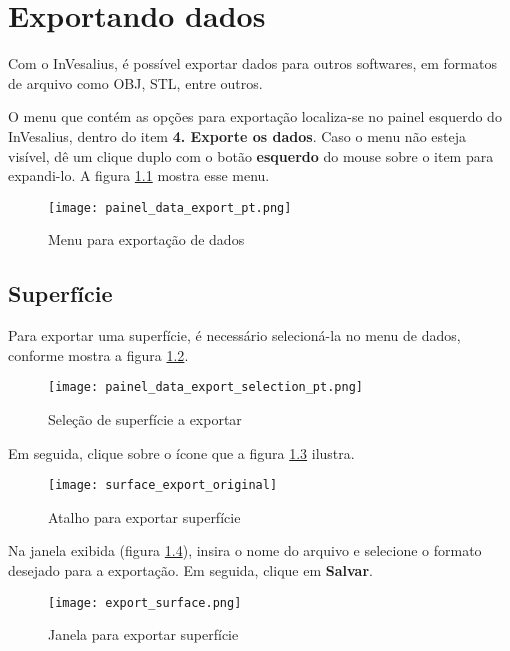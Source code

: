 \chapter{Exportando dados}

Com o InVesalius, é possível exportar dados para outros softwares, em formatos de arquivo
como OBJ, STL, entre outros.

O menu que contém as opções para exportação localiza-se no painel esquerdo do InVesalius,
dentro do item \textbf{4. Exporte os dados}. Caso o menu não esteja visível, dê um clique
duplo com o botão \textbf{esquerdo} do mouse sobre o item para expandi-lo. A figura
\ref{fig:data_export} mostra esse menu.

\begin{figure}[!htb]
\centering
\texttt{[image: painel\_data\_export\_pt.png]}
\caption{Menu para exportação de dados}
\label{fig:data_export}
\end{figure}

\section{Superfície}

Para exportar uma superfície, é necessário selecioná-la no menu de dados, conforme mostra a
figura \ref{fig:data_export_selection}.

\newpage

\begin{figure}[!htb]
\centering
\texttt{[image: painel\_data\_export\_selection\_pt.png]}
\caption{Seleção de superfície a exportar}
\label{fig:data_export_selection}
\end{figure}

Em seguida, clique sobre o ícone que a figura \ref{fig:surface_export_original} ilustra.

\begin{figure}[!htb]
\centering
\texttt{[image: surface\_export\_original]}
\caption{Atalho para exportar superfície}
\label{fig:surface_export_original}
\end{figure}

Na janela exibida (figura \ref{fig:export_data_window}), insira o nome do arquivo e
selecione o formato desejado para a exportação. Em seguida, clique em \textbf{Salvar}.


\begin{figure}[!htb]
\centering
\texttt{[image: export\_surface.png]}
\caption{Janela para exportar superfície}
\label{fig:export_data_window}
\end{figure}

